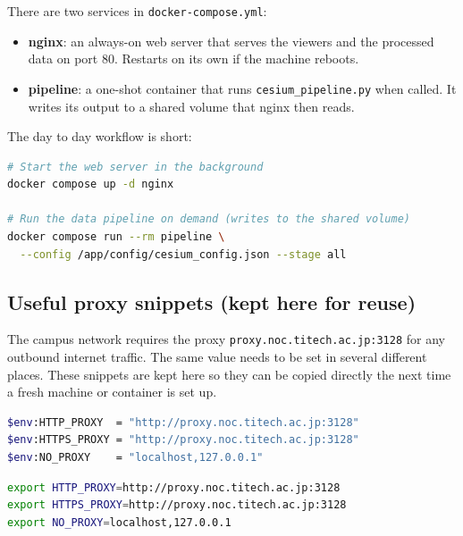 \documentclass[a4paper,12pt]{article}
\begin{document}
There are two services in \texttt{docker-compose.yml}:

\begin{tcolorbox}[title=Two services, kept simple]
\begin{itemize}
    \item \textbf{nginx}: an always-on web server that serves the viewers and the processed data on port 80. Restarts on its own if the machine reboots.
    \item \textbf{pipeline}: a one-shot container that runs \texttt{cesium\_pipeline.py} when called. It writes its output to a shared volume that nginx then reads.
\end{itemize}
\end{tcolorbox}

The day to day workflow is short:
\begin{lstlisting}[language=bash]
# Start the web server in the background
docker compose up -d nginx

# Run the data pipeline on demand (writes to the shared volume)
docker compose run --rm pipeline \
  --config /app/config/cesium_config.json --stage all
\end{lstlisting}

\subsection{Useful proxy snippets (kept here for reuse)}
The campus network requires the proxy \texttt{proxy.noc.titech.ac.jp:3128} for any outbound internet traffic. The same value needs to be set in several different places. These snippets are kept here so they can be copied directly the next time a fresh machine or container is set up.

\begin{tcolorbox}[title=Shell environment (PowerShell on Windows)]
\begin{lstlisting}[language=bash]
$env:HTTP_PROXY  = "http://proxy.noc.titech.ac.jp:3128"
$env:HTTPS_PROXY = "http://proxy.noc.titech.ac.jp:3128"
$env:NO_PROXY    = "localhost,127.0.0.1"
\end{lstlisting}
\end{tcolorbox}

\begin{tcolorbox}[title=Shell environment (bash / WSL / devcontainer)]
\begin{lstlisting}[language=bash]
export HTTP_PROXY=http://proxy.noc.titech.ac.jp:3128
export HTTPS_PROXY=http://proxy.noc.titech.ac.jp:3128
export NO_PROXY=localhost,127.0.0.1
\end{lstlisting}
\end{tcolorbox}
\end{document}
